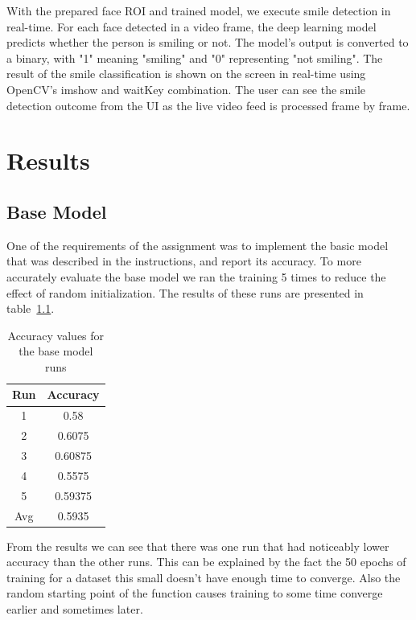 \documentclass[12pt,a4paper,english
]{tunithesis}
\begin{document}
With the prepared face ROI and trained model, we execute smile detection in real-time. For each face detected in a video frame, the deep learning model predicts whether the person is smiling or not. The model's output is converted to a binary, with "1" meaning "smiling" and "0" representing "not smiling". The result of the smile classification is shown on the screen in real-time using OpenCV's imshow and waitKey combination. The user can see the smile detection outcome from the UI as the live video feed is processed frame by frame.


\chapter{Results}
\label{sec:results}

\section{Base Model}
One of the requirements of the assignment was to implement the basic model that was described in the instructions, and report its accuracy. To more accurately evaluate the base model we ran the training 5 times to reduce the effect of random initialization. The results of these runs are presented in table~\ref{tab:basemodel}.

\begin{table}[h!]
\centering
\caption{Accuracy values for the base model runs}
\begin{tabular}{|c|c|}
\hline
Run & Accuracy \\
\hline
1 & 0.58 \\
2 & 0.6075 \\
3 & 0.60875 \\
4 & 0.5575 \\
5 & 0.59375 \\
\hline
Avg & 0.5935 \\
\hline
\end{tabular}
\label{tab:basemodel}
\end{table}

From the results we can see that there was one run that had noticeably lower accuracy than the other runs. This can be explained by the fact the 50 epochs of training for a dataset this small doesn't have enough time to converge. Also the random starting point of the function causes training to some time converge earlier and sometimes later.
\end{document}

